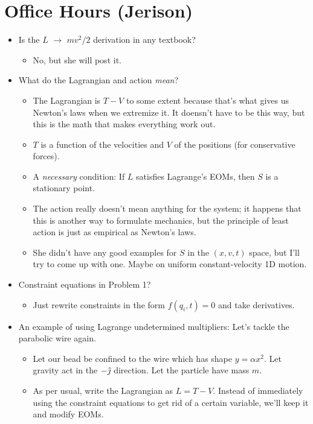 \documentclass[../notes.tex]{subfiles}
\begin{document}
\section{Office Hours (Jerison)}
\begin{itemize}
    \item Is the $L$ $\to$ $mv^2/2$ derivation in any textbook?
    \begin{itemize}
        \item No, but she will post it.
    \end{itemize}
    \item What do the Lagrangian and action \emph{mean}?
    \begin{itemize}
        \item The Lagrangian is $T-V$ to some extent because that's what gives us Newton's laws when we extremize it. It doensn't have to be this way, but this is the math that makes everything work out.
        \item $T$ is a function of the velocities and $V$ of the positions (for conservative forces).
        \item A \emph{necessary} condition: If $L$ satisfies Lagrange's EOMs, then $S$ is a stationary point.
        \item The action really doesn't mean anything for the system; it happens that this is another way to formulate mechanics, but the principle of least action is just as empirical as Newton's laws.
        \item She didn't have any good examples for $S$ in the $(x,v,t)$ space, but I'll try to come up with one. Maybe on uniform constant-velocity 1D motion.
    \end{itemize}
    \item Constraint equations in Problem 1?
    \begin{itemize}
        \item Just rewrite constraints in the form $f(q_i,t)=0$ and take derivatives.
    \end{itemize}
    \item An example of using Lagrange undetermined multipliers: Let's tackle the parabolic wire again.
    \begin{itemize}
        \item Let our bead be confined to the wire which has shape $y=\alpha x^2$. Let gravity act in the $-\hat{\jmath}$ direction. Let the particle have mass $m$.
        \item As per usual, write the Lagrangian as $L=T-V$. Instead of immediately using the constraint equations to get rid of a certain variable, we'll keep it and modify EOMs.

\end{itemize}
\end{itemize}
\end{document}
